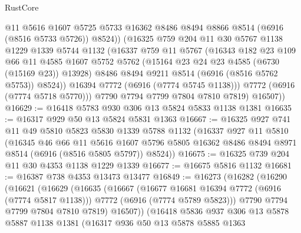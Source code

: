 \begin{lexlean}{RustCore}
\begin{coremodule}
                @11
                @5616
                @1607
                @5725
                @5733
                @16362
                @8486
                @8494
                @8866
                @8514
                (@6916 (@8516 @5733 @5726))
                @8524))
            (@16325
              @759
              @204
              @11
              @30
              @5767
              @1138
              @1229
              @1339
              @5744
              @1132
              (@16337
                @759
                @11
                @5767
                (@16343
                  @182
                  @23
                  @109
                  @66
                  @11
                  @4585
                  @1607
                  @5752
                  @5762
                  (@15164 @23 @24 @23 @4585 (@6730 (@15169 @23)) @13928)
                  @8486
                  @8494
                  @9211
                  @8514
                  (@6916 (@8516 @5762 @5753))
                  @8524))
              @16394
              @7772
              (@6916 (@7774 @5745 @1138)))
            @7772
            (@6916 (@7774 @5718 @5770)))
          @7790
          @7794
          @7799
          @7804
          @7810
          @7819)
        @16507))
@16629 := @16418 @5783 @930 @306 @13 @5824 @5833 @1138 @1381
@16635 := @16317 @929 @50 @13 @5824 @5831 @1363
@16667 := @16325
    @927
    @741
    @11
    @49
    @5810
    @5823
    @5830
    @1339
    @5788
    @1132
    (@16337
      @927
      @11
      @5810
      (@16345
        @46
        @66
        @11
        @5616
        @1607
        @5796
        @5805
        @16362
        @8486
        @8494
        @8971
        @8514
        (@6916 (@8516 @5805 @5797))
        @8524))
@16675 := @16325 @739 @204 @11 @30 @4353 @1138 @1229 @1339
@16677 := @16675 @5816 @1132
@16681 := @16387 @738 @4353 @13473 @13477
@16849 := @16273
    (@16282
      (@16290
        (@16621
          (@16629
            (@16635
              (@16667
                (@16677 @16681 @16394 @7772 (@6916 (@7774 @5817 @1138)))
                @7772
                (@6916 (@7774 @5789 @5823)))
              @7790
              @7794
              @7799
              @7804
              @7810
              @7819)
            @16507))
        (@16418
          @5836
          @937
          @306
          @13
          @5878
          @5887
          @1138
          @1381
          (@16317
            @936
            @50
            @13
            @5878
            @5885
            @1363

\end{coremodule}
\end{lexlean}
